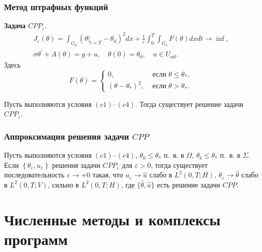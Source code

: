 \begin{frame}
    \frametitle{Метод штрафных функций}

    \textbf{Задача} $CPP_{\varepsilon}$.
    \[
        \begin{gathered}
            J_{\varepsilon}(\theta)=\int_{G_{d}}
            \left(\left.\theta\right|_{t=T}
            -\theta_{d}\right)^{2} d x
            + \frac{1}{\varepsilon} \int_{0}^{T} \int_{G_{b}} F(\theta) d x d t \rightarrow \inf, \\
            \sigma \theta^{\prime}+A(\theta)=g+u, \quad \theta(0)=\theta_{0}, \quad u \in U_{a d}.
        \end{gathered}
    \]
    Здесь
    \[
        F(\theta)=
        \begin{cases}
            0, & \text { если } \theta \leq \theta_{*}, \\
            \left(\theta-\theta_{*}\right)^{2}, & \text { если } \theta>\theta_{*}.
        \end{cases}
    \]
    \begin{theorem}[3.5]
        \label{th:3_3:2}
        Пусть выполняются условия $(c1)$--$(c4)$.
        Тогда существует решение задачи $CPP_{\varepsilon}$.
    \end{theorem}
\end{frame}

\begin{frame}
    \frametitle{Аппроксимация решения задачи $CPP$}
    \begin{theorem}[3.6]
        Пусть выполняются условия $(c1)$--$(c4)$,
        $\theta_{0} \leq \theta_{*}$ п.\ в. в $\Omega$, $\theta_{b} \leq \theta_{*}$ п.\ в. в
        $\Sigma$.
        Если $\left\{\theta_{\varepsilon}, u_{\varepsilon}\right\}$ решения задачи
        $CPP_{\varepsilon}$ для $\varepsilon>0$, тогда существует последовательность
        $\varepsilon \rightarrow+0$ такая, что $u_{\varepsilon} \rightarrow \widehat{u}$ слабо в
        $L^{2}(0, T ; H), \, \theta_{\varepsilon} \rightarrow \widehat{\theta}$
        слабо в $L^{2}(0, T ; V)$, сильно в $L^{2}(0, T ; H)$, где
        $\{\widehat{\theta}, \widehat{u}\}$ есть решение задачи $CPP$.
    \end{theorem}
\end{frame}


\section{Численные методы и комплексы программ}\label{sec:prog}

